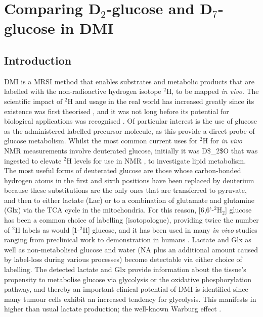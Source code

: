 \chapter{Comparing D$_2$-glucose and D$_7$-glucose in DMI}
\label{Chap:Glucose}

\section{Introduction}

\ac{DMI} is a \ac{MRSI} method that enables substrates and metabolic products that are labelled with the non-radioactive hydrogen isotope $^2$H, to be mapped \textit{in vivo}. The scientific impact of $^2$H and usage in the real world has increased greatly since its existence was first theorised \cite{Urey1932AConcentration}, and it was not long before its potential for biological applications was recognised \cite{Schoenheimer1935DeuteriumMetabolism, Schoenheimer1938TheMetabolism}. Of particular interest is the use of glucose as the administered labelled precursor molecule, as this provide a direct probe of glucose metabolism. Whilst the most common current uses for $^2$H for \textit{in vivo} \ac{NMR} measurements involve deuterated glucose, initially it was \ac{D$_2$O} that was ingested to elevate $^2$H levels for use in \ac{NMR} \cite{Brereton1986PreliminarySpectroscopy, Irving1987InSpectroscopy}, to investigate lipid metabolism. The most useful forms of deuterated glucose are those whose carbon-bonded hydrogen atoms in the first and sixth positions have been replaced by deuterium because these substitutions are the only ones that are transferred to pyruvate, and then to either lactate (Lac) or to a combination of glutamate and glutamine (Glx) via the \ac{TCA} cycle in the mitochondria. For this reason, [6,6'-$^2$H$_2$] glucose has been a common choice of labelling (isotopologue), providing twice the number of $^2$H labels as would [1-$^2$H] glucose, and it has been used in many \textit{in vivo} studies ranging from preclinical work \cite{Lu2017QuantitativeSpectroscopy, Meerwaldt2023InImaging} to demonstration in humans  \cite{DeFeyter2018DeuteriumVivo, Roig2022Deuterium7T}. Lactate and Glx as well as non-metabolised glucose and water (\ac{NA} plus an additional amount caused by label-loss during various processes) become detectable via either choice of labelling. The detected lactate and Glx provide information about the tissue’s propensity to metabolise glucose via glycolysis or the oxidative phosphorylation pathway, and thereby an important clinical potential of DMI is identified since many tumour cells exhibit an increased tendency for glycolysis. This manifests in higher than usual lactate production;  the well-known Warburg effect \cite{Warburg1956OnCells}.    

